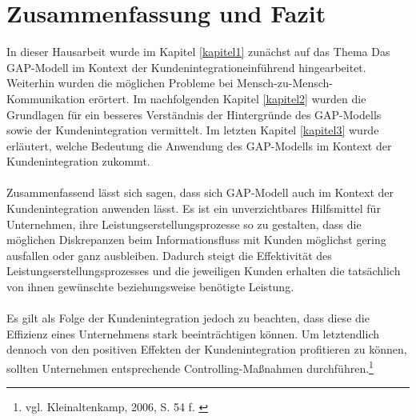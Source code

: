 \chapter{Zusammenfassung und Fazit}
In dieser Hausarbeit wurde im Kapitel \ref{kapitel1} zunächst auf das Thema \glqq Das GAP-Modell im Kontext der Kundenintegration\grqq{}einführend hingearbeitet. Weiterhin wurden die möglichen Probleme bei Mensch-zu-Mensch-Kommunikation erörtert. Im nachfolgenden Kapitel \ref{kapitel2} wurden die Grundlagen für ein besseres Verständnis der Hintergründe des GAP-Modells sowie der Kundenintegration vermittelt. Im letzten Kapitel \ref{kapitel3} wurde erläutert, welche Bedeutung die Anwendung des GAP-Modells im Kontext der Kundenintegration zukommt.
\\ \\
Zusammenfassend lässt sich sagen, dass sich GAP-Modell auch im Kontext der Kundenintegration anwenden lässt. Es ist ein unverzichtbares Hilfsmittel für Unternehmen, ihre Leistungserstellungsprozesse so zu gestalten, dass die möglichen Diskrepanzen beim Informationsfluss mit Kunden möglichst gering ausfallen oder ganz ausbleiben. Dadurch steigt die Effektivität des Leistungserstellungsprozesses und die jeweiligen Kunden erhalten die tatsächlich von ihnen gewünschte beziehungsweise benötigte Leistung.
\\ \\
Es gilt als Folge der Kundenintegration jedoch zu beachten, dass diese die Effizienz eines Unternehmens stark beeinträchtigen können. Um letztendlich dennoch von den positiven Effekten der Kundenintegration profitieren zu können, sollten Unternehmen entsprechende Controlling-Maßnahmen durchführen.\footnote{vgl. Kleinaltenkamp, 2006, S. 54 f. \cite{Kleinaltenkamp2006}}

